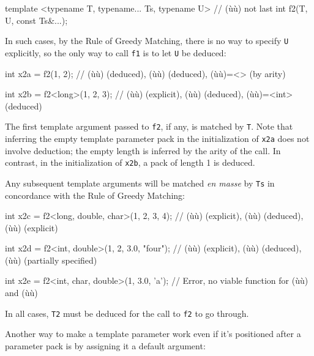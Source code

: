 \begin{emcppslisting}
template <typename T, typename... Ts, typename U>  // (ù{}ù) not last
int f2(T, U, const Ts&...);
\end{emcppslisting}
    

\noindent In such cases, by the Rule of Greedy Matching, there is no way to
specify \lstinline!U! explicitly, so the only way to call \lstinline!f1! is to
let \lstinline!U! be deduced:

\begin{emcppslisting}
int x2a = f2(1, 2);
    // (ù{}ù) (deduced), (ù{}ù) (deduced), (ù{}ù)=<> (by arity)

int x2b = f2<long>(1, 2, 3);
    // (ù{}ù) (explicit), (ù{}ù) (deduced), (ù{}ù)=<int> (deduced)
\end{emcppslisting}
    

\noindent The first template argument passed to \lstinline!f2!, if any, is matched by
\lstinline!T!. Note that inferring the empty template parameter pack in the
initialization of \lstinline!x2a! does not involve deduction; the empty
length is inferred by the arity of the call. In contrast, in the
initialization of \lstinline!x2b!, a pack of length 1 is deduced.

Any subsequent template arguments will be matched \emph{en masse} by
\lstinline!Ts! in concordance with the Rule of Greedy Matching:

\begin{emcppslisting}
int x2c = f2<long, double, char>(1, 2, 3, 4);
    // (ù{}ù) (explicit), (ù{}ù) (deduced), (ù{}ù) (explicit)

int x2d = f2<int, double>(1, 2, 3.0, "four");
    // (ù{}ù) (explicit), (ù{}ù) (deduced), (ù{}ù) (partially specified)

int x2e = f2<int, char, double>(1, 3.0, 'a');
    // Error, no viable function for (ù{}ù) and (ù{}ù)
\end{emcppslisting}
    

\noindent In all cases, \lstinline!T2! must be deduced for the call to \lstinline!f2! to
go through.

Another way to make a template parameter work even if it's positioned
after a parameter pack is by assigning it a default argument:

